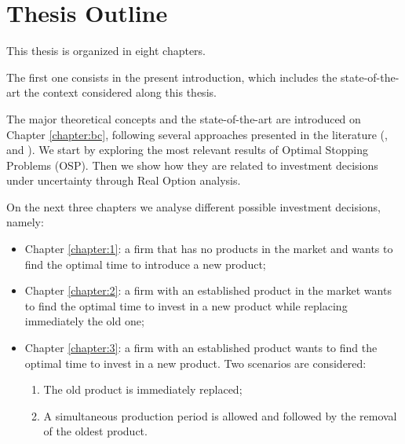 \section{Thesis Outline}
\label{section:outline}


This thesis is organized in eight chapters.

The first one consists in the present introduction, which includes the state-of-the-art the context considered along this thesis.



The major theoretical concepts and the state-of-the-art are introduced on Chapter \ref{chapter:bc}, following several approaches presented in the literature (\cite{dixit:book}, \cite{ross} and \cite{oksendal:book}).
We start by exploring the most relevant results of Optimal Stopping Problems (OSP). Then we show how they are related to investment decisions under uncertainty through Real Option analysis.

On the next three chapters we analyse different possible investment decisions, namely:
\begin{itemize}
	\item Chapter \ref{chapter:1}: a firm that has no products in the market and wants to find the optimal time to introduce a new product;
	\item Chapter \ref{chapter:2}: a firm with an established product in the market wants to find the optimal time to invest in a new product while replacing immediately the old one;
	\item Chapter \ref{chapter:3}: a firm with an established product wants to find the optimal time to invest in a new product.
	Two scenarios are considered:
	 \begin{enumerate}
	 	\item The old product is immediately replaced;
	 	\item A simultaneous production period is allowed and followed by the removal of the oldest product.
	 \end{enumerate}
\end{itemize}

